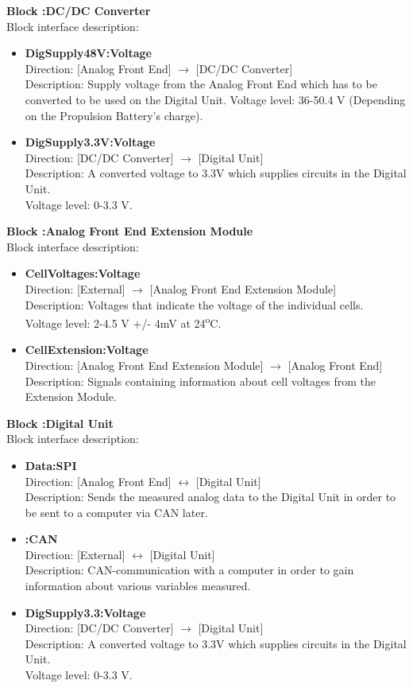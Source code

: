 \textbf{Block :DC/DC Converter}\\
Block interface description:
\begin{itemize}
	\item \textbf{DigSupply48V:Voltage}\\
	Direction: [Analog Front End] $\rightarrow$ [DC/DC Converter]\\
	Description: Supply voltage from the Analog Front End which has to be converted to be used on the Digital Unit.
	Voltage level: 36-50.4 V (Depending on the Propulsion Battery's charge).
	\item \textbf{DigSupply3.3V:Voltage}\\
	Direction: [DC/DC Converter] $\rightarrow$ [Digital Unit]\\
	Description: A converted voltage to 3.3V which supplies circuits in the Digital Unit.\\
	Voltage level: 0-3.3 V.
\end{itemize}

\textbf{Block :Analog Front End Extension Module}\\
Block interface description:
\begin{itemize}
	\item \textbf{CellVoltages:Voltage}\\
	Direction: [External] $\rightarrow$ [Analog Front End Extension Module]\\
	Description: Voltages that indicate the voltage of the individual cells.\\
	Voltage level: 2-4.5 V +/- 4mV at 24\textsuperscript{o}C\cite{BMSDocumentation}. 
	\item \textbf{CellExtension:Voltage}\\
	Direction: [Analog Front End Extension Module] $\rightarrow$ [Analog Front End]\\
	Description: Signals containing information about cell voltages from the Extension Module. 
\end{itemize}

\textbf{Block :Digital Unit}\\
Block interface description:
\begin{itemize}
	\item \textbf{Data:SPI}\\
	Direction: [Analog Front End] $\leftrightarrow$ [Digital Unit]\\
	Description: Sends the measured analog data to the Digital Unit in order to be sent to a computer via CAN later.
	\item \textbf{:CAN}\\
	Direction: [External] $\leftrightarrow$ [Digital Unit]\\
	Description: CAN-communication with a computer in order to gain information about various variables measured.
	\item \textbf{DigSupply3.3:Voltage}\\
	Direction: [DC/DC Converter] $\rightarrow$ [Digital Unit]\\
	Description: A converted voltage to 3.3V which supplies circuits in the Digital Unit. \\
	Voltage level: 0-3.3 V. 
\end{itemize}

